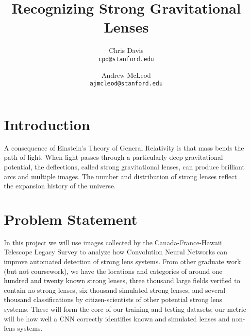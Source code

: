 \documentclass[10pt,twocolumn,letterpaper]{article}
\begin{document}
\title{Recognizing Strong Gravitational Lenses}

\author{Chris Davis\\
{\tt\small cpd@stanford.edu}
\and
Andrew McLeod\\
{\tt\small ajmcleod@stanford.edu}
}

\maketitle


\section{Introduction}

A consequence of Einstein's Theory of General Relativity is that mass bends the
path of light. When light passes through a particularly deep gravitational
potential, the deflections, called strong gravitational lenses, can produce
brilliant arcs and multiple images. The number and distribution of strong
lenses reflect the expansion history of the universe.

\section{Problem Statement}

In this project we will use images collected by the Canada-France-Hawaii
Telescope Legacy Survey to analyze how Convolution Neural Networks can improve
automated detection of strong lens systems. From other graduate work (but not
coursework), we have the locations and categories of around one hundred and
twenty known strong lenses, three thousand large fields verified to contain no
strong lenses, six thousand simulated strong lenses, and several thousand
classifications by citizen-scientists of other potential strong lens systems.
These will form the core of our training and testing datasets; our metric will
be how well a CNN correctly identifies known and simulated lenses and non-lens
systems.
\end{document}
